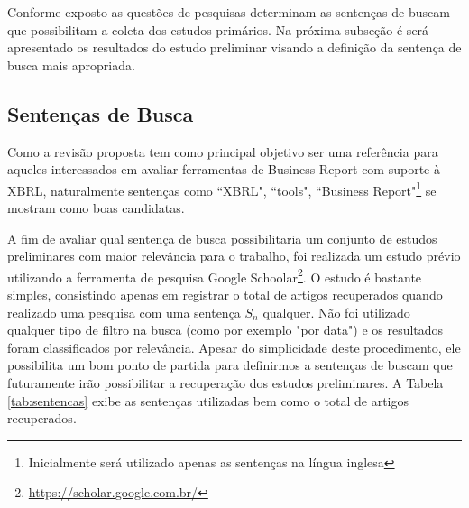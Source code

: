 \documentclass{article}
\begin{document}
Conforme exposto as questões de pesquisas determinam as sentenças de
buscam que possibilitam a coleta dos estudos primários. Na próxima
subseção é será apresentado os resultados do estudo preliminar visando
a definição da sentença de busca mais apropriada.

\subsection{Sentenças de Busca}
\label{subsec:setences}

Como a revisão proposta tem como principal objetivo ser uma referência para aqueles interessados em avaliar ferramentas de Business Report com suporte à XBRL, naturalmente sentenças como ``XBRL", ``tools", ``Business Report"\footnote{Inicialmente será utilizado apenas as sentenças na língua inglesa} se mostram como boas candidatas. 

A fim de avaliar qual sentença de busca possibilitaria um conjunto de
estudos preliminares com maior relevância para o trabalho, foi
realizada um estudo prévio utilizando a ferramenta de pesquisa Google
Schoolar\footnote{\url{https://scholar.google.com.br/}}. O estudo é
bastante simples, consistindo apenas em registrar o total de artigos
recuperados quando realizado uma pesquisa com uma sentença $S_n$
qualquer. Não foi utilizado qualquer tipo de filtro na busca (como por
exemplo "por data") e os resultados foram classificados por
relevância. Apesar do simplicidade deste procedimento, ele possibilita
um bom ponto de partida para definirmos a sentenças de buscam que
futuramente irão possibilitar a recuperação dos estudos preliminares. 
A Tabela \ref{tab:sentencas} exibe as sentenças utilizadas bem como o total de artigos recuperados.
\begin{table}[]
\centering
{}
\caption{Total de artigos por sentença}
\label{tab:sentencas}
\end{table}
\end{document}
